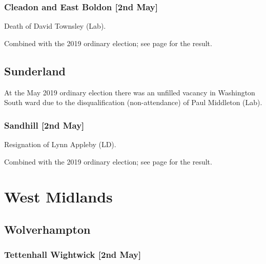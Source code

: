 \documentclass[a4paper,openany]{book}
\begin{document}
\begin{resultsiii}
\subsubsection*{Cleadon and East Boldon \hspace*{\fill}\nolinebreak[1]%
	\enspace\hspace*{\fill}
	[2nd May]}


Death of David Townsley (Lab).

Combined with the 2019 ordinary election; see page \pageref{SouthTynesideCleadonEastBoldon} for the result.

\subsection*{Sunderland}

At the May 2019 ordinary election there was an unfilled vacancy in Washington South ward due to the disqualification (non-attendance) of Paul Middleton (Lab).

\subsubsection*{Sandhill \hspace*{\fill}\nolinebreak[1]%
	\enspace\hspace*{\fill}
	[2nd May]}


Resignation of Lynn Appleby (LD).

Combined with the 2019 ordinary election; see page \pageref{SandhillSunderland} for the result.

\section{West Midlands}

\subsection*{Wolverhampton}

\subsubsection*{Tettenhall Wightwick \hspace*{\fill}\nolinebreak[1]%
	\enspace\hspace*{\fill}
	[2nd May]}


\end{resultsiii}
\end{document}
